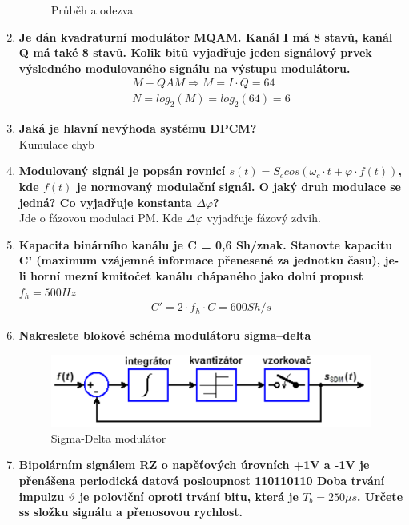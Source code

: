 \begin{enumerate}
\begin{figure}[h]
        \caption{Průběh a odezva}
    \end{figure}
    \item \textbf{Je dán kvadraturní modulátor MQAM. Kanál I má 8 stavů, kanál Q má také 8 stavů. Kolik
    bitů vyjadřuje jeden signálový prvek výsledného modulovaného signálu na výstupu modulátoru.}
    \begin{align*}
        M-QAM \Rightarrow M = I\cdot Q = 64\\
        N = log_{2}(M) = log_{2}(64) = 6
    \end{align*}
    \item \textbf{Jaká je hlavní nevýhoda systému DPCM?}\\
    Kumulace chyb
    \item \textbf{Modulovaný signál je popsán rovnicí \(s(t) = S_c cos(\omega_c \cdot t+ \varphi\cdot f(t))\), kde \(f(t)\) je normovaný modulační signál. O jaký druh modulace se jedná? Co vyjadřuje konstanta \(\Delta \varphi\)?}\\
    Jde o fázovou modulaci PM. Kde \(\Delta \varphi\) vyjadřuje fázový zdvih.
    \item \textbf{Kapacita binárního kanálu je C = 0,6 Sh/znak. Stanovte kapacitu C' (maximum vzájemné
    informace přenesené za jednotku času), je-li horní mezní kmitočet kanálu chápaného jako
    dolní propust \(f_h = 500Hz\)}
    \begin{align*}
        C' = 2 \cdot f_h \cdot C = 600Sh/s
    \end{align*}
    \item \textbf{Nakreslete blokové schéma modulátoru sigma–delta}
    \begin{figure}[h]
        \centering
        \includegraphics[scale = 0.7]{images/SDM.png}
        \caption{Sigma-Delta modulátor}
    \end{figure}
    \item \textbf{Bipolárním signálem RZ o napěťových úrovních +1V a -1V je přenášena periodická datová
    posloupnost 110110110 Doba trvání impulzu \(\vartheta\) je poloviční oproti trvání bitu,
    která je \(T_b = 250 \mu s\). Určete ss složku signálu a přenosovou rychlost.}
    \begin{align*}

\end{align*}
\end{enumerate}
